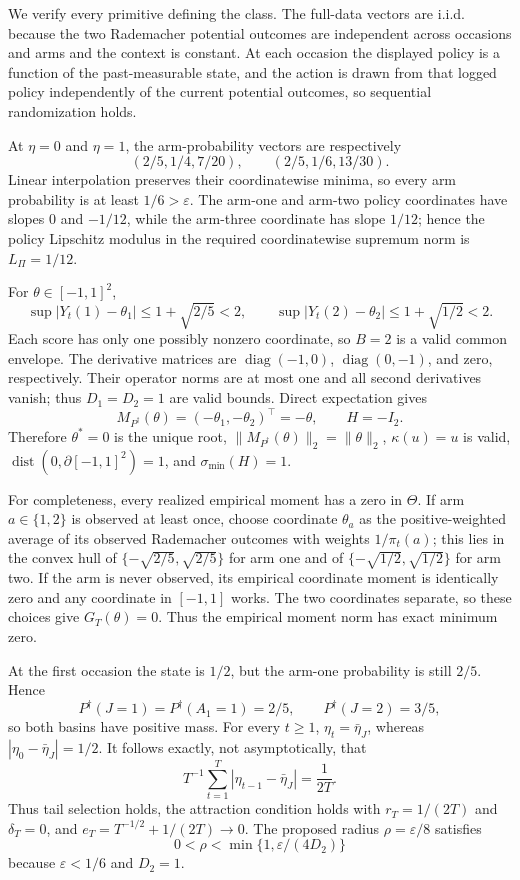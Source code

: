 We verify every primitive defining the class. The full-data vectors are i.i.d. because the two Rademacher potential outcomes are independent across occasions and arms and the context is constant. At each occasion the displayed policy is a function of the past-measurable state, and the action is drawn from that logged policy independently of the current potential outcomes, so sequential randomization holds.

At \(\eta=0\) and \(\eta=1\), the arm-probability vectors are respectively
\[
 (2/5,1/4,7/20),\qquad (2/5,1/6,13/30).
\]
Linear interpolation preserves their coordinatewise minima, so every arm probability is at least \(1/6>\varepsilon\). The arm-one and arm-two policy coordinates have slopes \(0\) and \(-1/12\), while the arm-three coordinate has slope \(1/12\); hence the policy Lipschitz modulus in the required coordinatewise supremum norm is \(L_\Pi=1/12\).

For \(\theta\in[-1,1]^2\),
\[
 \sup|Y_t(1)-\theta_1|\le1+\sqrt{2/5}<2,
 \qquad
 \sup|Y_t(2)-\theta_2|\le1+\sqrt{1/2}<2.
\]
Each score has only one possibly nonzero coordinate, so \(B=2\) is a valid common envelope. The derivative matrices are \(\operatorname{diag}(-1,0)\), \(\operatorname{diag}(0,-1)\), and zero, respectively. Their operator norms are at most one and all second derivatives vanish; thus \(D_1=D_2=1\) are valid bounds. Direct expectation gives
\[
 M_{P^\dagger}(\theta)
 =(-\theta_1,-\theta_2)^\top=-\theta,
 \qquad H=-I_2.
\]
Therefore \(\theta^*=0\) is the unique root, \(\|M_{P^\dagger}(\theta)\|_2=\|\theta\|_2\), \(\kappa(u)=u\) is valid, \(\operatorname{dist}(0,\partial[-1,1]^2)=1\), and \(\sigma_{\min}(H)=1\).

For completeness, every realized empirical moment has a zero in \(\Theta\). If arm \(a\in\{1,2\}\) is observed at least once, choose coordinate \(\theta_a\) as the positive-weighted average of its observed Rademacher outcomes with weights \(1/\pi_t(a)\); this lies in the convex hull of \(\{-\sqrt{2/5},\sqrt{2/5}\}\) for arm one and of \(\{-\sqrt{1/2},\sqrt{1/2}\}\) for arm two. If the arm is never observed, its empirical coordinate moment is identically zero and any coordinate in \([-1,1]\) works. The two coordinates separate, so these choices give \(G_T(\theta)=0\). Thus the empirical moment norm has exact minimum zero.

At the first occasion the state is \(1/2\), but the arm-one probability is still \(2/5\). Hence
\[
 P^\dagger(J=1)=P^\dagger(A_1=1)=2/5,
 \qquad P^\dagger(J=2)=3/5,
\]
so both basins have positive mass. For every \(t\ge1\), \(\eta_t=\bar\eta_J\), whereas \(|\eta_0-\bar\eta_J|=1/2\). It follows exactly, not asymptotically, that
\[
 T^{-1}\sum_{t=1}^T|\eta_{t-1}-\bar\eta_J|=\frac1{2T}.
\]
Thus tail selection holds, the attraction condition holds with \(r_T=1/(2T)\) and \(\delta_T=0\), and \(e_T=T^{-1/2}+1/(2T)\to0\). The proposed radius \(\rho=\varepsilon/8\) satisfies
\[
 0<\rho<\min\{1,\varepsilon/(4D_2)\}
\]
because \(\varepsilon<1/6\) and \(D_2=1\).

